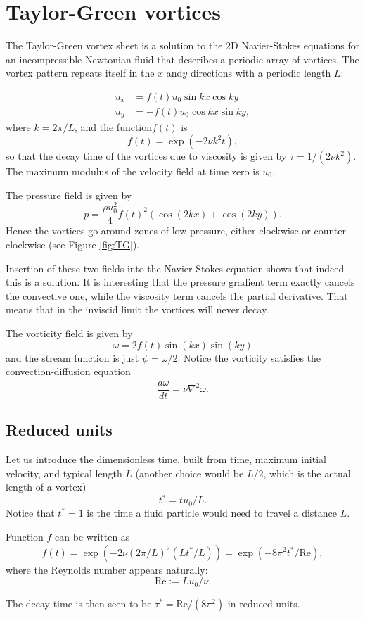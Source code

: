 \section{Taylor-Green vortices}

The Taylor-Green vortex sheet is a solution to the 2D Navier-Stokes
equations for an incompressible Newtonian fluid that describes a
periodic array of vortices. The vortex pattern repeats itself in the
$ x$ and$ y$ directions with a periodic length $ L$:

\begin{align*}
 u_x &= f(t) u_0 \sin k x \cos k y  \\
 u_y &= -f(t) u_0 \cos k x \sin k y ,
\end{align*}
where $ k=2\pi/L$, and the function$ f(t)$ is
\[
  f(t)= \exp(-2\nu k^2 t),
\]
so that the decay time of the vortices due to viscosity is given by
$ \tau=1/(2\nu
k^2)$. The maximum modulus of the velocity field at time zero is
$ u_0$.

The pressure field is given by
\[
  p = \frac{\rho u_0^2 }{4} f(t)^2 \left( \cos (2kx) + \cos (2ky) \right) .
\]
%
Hence the vortices go around zones of low pressure, either clockwise
or counter-clockwise (see Figure \ref{fig:TG}).

Insertion of these two fields into the Navier-Stokes equation shows
that indeed this is a solution. It is interesting that the pressure
gradient term exactly cancels the convective one, while the viscosity
term cancels the partial derivative. That means that in the inviscid
limit the vortices will never decay.

The vorticity field is given by
\[
  \omega = 2 f(t) \sin (kx) \sin (ky)
\]
and the stream function is just $ \psi=\omega /2$. Notice the
vorticity satisfies the convection-diffusion equation
\[
  \frac{d \omega}{d t}= \nu \nabla^2 \omega.
\]

\subsection{Reduced units}

Let us introduce the dimensionless time, built from time, maximum
initial velocity, and typical length $L$ (another choice would be
$L/2$, which is the actual length of a vortex)
\[
  t^*= t u_0 / L.
\]
Notice that $ t^*=1$ is the time a fluid particle would need to travel
a distance $L$.

Function $f$ can be written as
\[
  f(t)= \exp(-2\nu (2\pi/L)^2 (L t^* / L) ) = \exp(-8 \pi^2 t^* / \mathrm{Re}) ,
\]
%
where the Reynolds number appears naturally:
%
\[
  \mathrm{Re} := L u_0 / \nu .
\]

The decay time is then seen to be $ \tau^*=\mathrm{Re}/(8\pi^2)$ in
reduced units.
